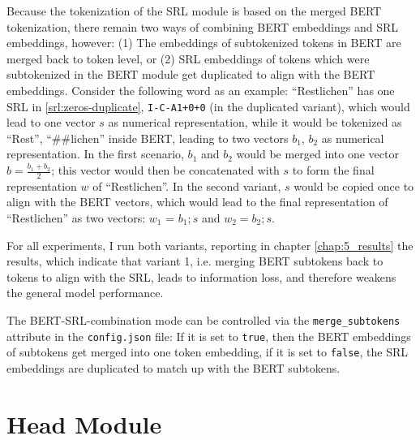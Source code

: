 Because the tokenization of the SRL module is based on the merged BERT tokenization,
there remain two ways of combining BERT embeddings and SRL embeddings, however: (1) The
embeddings of subtokenized tokens in BERT are merged back to token level, or (2) SRL
embeddings of tokens which were subtokenized in the BERT module get duplicated to align
with the BERT embeddings. Consider the following word as an example: ``Restlichen'' has one
SRL in \ref{srl:zeros-duplicate}, \texttt{I-C-A1+0+0} (in the duplicated variant), which
would lead to one vector $s$ as numerical representation, while it would be tokenized as
``Rest'', ``\#\#lichen'' inside BERT, leading to two vectors $b_1$, $b_2$ as numerical
representation. In the first scenario, $b_1$ and $b_2$ would be merged into one vector
$b = \frac{b_1 + b_2}{2}$; this vector would then be concatenated
with $s$ to form the final representation $w$ of ``Restlichen''. In the second variant,
$s$ would be copied once to align with the BERT vectors, which would lead
to the final representation of ``Restlichen'' as two vectors: $w_1$ = $b_1 ; s$ and
$w_2 = b_2 ; s$.

For all experiments, I run both variants, reporting in chapter \ref{chap:5_results} the results,
which indicate that variant 1, i.e. merging BERT subtokens back to tokens to align with the SRL,
leads to information loss, and therefore weakens the general model performance.

\begin{tcolorbox}[
  colback=blue!5!white,
  colframe=blue!75!black,
  title={\centering Code}]

  The BERT-SRL-combination mode can be controlled via the \texttt{merge\_subtokens} attribute
  in the \texttt{config.json} file: If it is set to \texttt{true}, then the BERT
  embeddings of subtokens get merged into one token embedding, if it is set to
  \texttt{false}, the SRL embeddings are duplicated to match up with the BERT
  subtokens.
\end{tcolorbox}


\section{Head Module}

